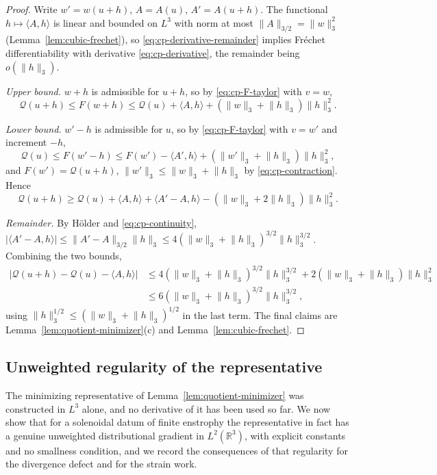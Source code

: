 \documentclass[11pt]{article}
\theoremstyle{definition}
\theoremstyle{plain}
\newcommand{\R}{\mathbb R}
\newcommand{\norm}[1]{\lVert #1\rVert}
\begin{document}
\begin{proof}
Write $w'=w(u+h)$, $A=A(u)$, $A'=A(u+h)$.  The functional
$h\mapsto\langle A,h\rangle$ is linear and bounded on $L^3$ with norm at
most $\norm A_{3/2}=\norm w_3^2$ (Lemma~\ref{lem:cubic-frechet}), so
\eqref{eq:cp-derivative-remainder} implies Fr\'echet differentiability
with derivative \eqref{eq:cp-derivative}, the remainder being
$o(\norm h_3)$.

\emph{Upper bound.}  $w+h$ is admissible for $u+h$, so by
\eqref{eq:cp-F-taylor} with $v=w$,
\[
 \mathcal Q(u+h)\le F(w+h)
 \le\mathcal Q(u)+\langle A,h\rangle+(\norm w_3+\norm h_3)\norm h_3^2 .
\]

\emph{Lower bound.}  $w'-h$ is admissible for $u$, so by
\eqref{eq:cp-F-taylor} with $v=w'$ and increment $-h$,
\[
 \mathcal Q(u)\le F(w'-h)
 \le F(w')-\langle A',h\rangle+(\norm{w'}_3+\norm h_3)\norm h_3^2 ,
\]
and $F(w')=\mathcal Q(u+h)$, $\norm{w'}_3\le\norm w_3+\norm h_3$ by
\eqref{eq:cp-contraction}.  Hence
\[
 \mathcal Q(u+h)\ge\mathcal Q(u)+\langle A,h\rangle+\langle A'-A,h\rangle
 -(\norm w_3+2\norm h_3)\norm h_3^2 .
\]

\emph{Remainder.}  By H\"older and \eqref{eq:cp-continuity},
$|\langle A'-A,h\rangle|\le\norm{A'-A}_{3/2}\norm h_3
\le4(\norm w_3+\norm h_3)^{3/2}\norm h_3^{3/2}$.  Combining the two
bounds,
\begin{align*}
 \bigl|\mathcal Q(u+h)-\mathcal Q(u)-\langle A,h\rangle\bigr|
 &\le4(\norm w_3+\norm h_3)^{3/2}\norm h_3^{3/2}
 +2(\norm w_3+\norm h_3)\norm h_3^2\\
 &\le6(\norm w_3+\norm h_3)^{3/2}\norm h_3^{3/2},
\end{align*}
using $\norm h_3^{1/2}\le(\norm w_3+\norm h_3)^{1/2}$ in the last term.
The final claims are Lemma~\ref{lem:quotient-minimizer}(c) and
Lemma~\ref{lem:cubic-frechet}.
\end{proof}

\subsection{Unweighted regularity of the representative}
\label{subsec:quotient-divcurl}

The minimizing representative of Lemma~\ref{lem:quotient-minimizer} was
constructed in $L^3$ alone, and no derivative of it has been used so far.
We now show that for a solenoidal datum of finite enstrophy the
representative in fact has a genuine unweighted distributional gradient in
$L^2(\R^3)$, with explicit constants and no smallness condition, and we
record the consequences of that regularity for the divergence defect and
for the strain work.
\end{document}

